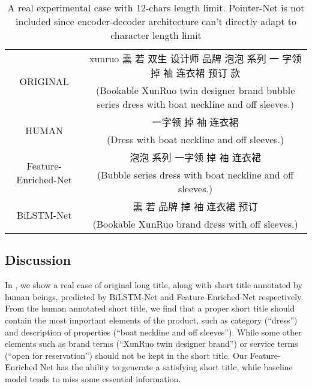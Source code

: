 \begin{table*}[ht]
	\scriptsize
	\centering
	\caption{A real experimental case with 12-chars length limit.
		Pointer-Net is not included since encoder-decoder architecture can't directly adapt to character length limit}
	\label{tab:case_study}
	\begin{tabular}{c|c}
		\toprule
		\multirow{2}{*}{ORIGINAL} & xunruo 熏 若 双生 设计师 品牌 泡泡 系列 一 字领 掉 袖 连衣裙 预订 款  \\
		& (Bookable XunRuo twin designer brand bubble series dress with boat neckline and off sleeves.) \\ 
		\midrule
		\multirow{2}{*}{HUMAN} & 一字领 掉 袖 连衣裙 \\
		& (Dress with boat neckline and off sleeves.) \\
		\midrule
		\multirow{2}{*}{Feature-Enriched-Net} & 泡泡 系列 一字领 掉 袖 连衣裙 \\
		& (Bubble series dress with boat neckline and off sleeves.) \\
		\midrule
		\multirow{2}{*}{BiLSTM-Net} & 熏 若 品牌 掉 袖 连衣裙 预订\\
		& (Bookable XunRuo brand dress with off sleeves.) \\
		\bottomrule
	\end{tabular}
\end{table*}


\subsection{Discussion}
In , we show a real case of original long title, 
along with short title annotated by human beings, 
predicted by BiLSTM-Net and Feature-Enriched-Net respectively.
From the human annotated short title,
we find that a proper short title should contain 
the most important elements of the product,
such as category (``dress'') and description of properties (``boat neckline and off sleeves'').
While some other elements such as 
brand terms (``XunRuo twin designer brand'')
or service terms (``open for reservation'') 
should not be kept in the short title.
Our Feature-Enriched Net has the ability to generate
a satisfying short title,
while baseline model tends to miss some essential information.

